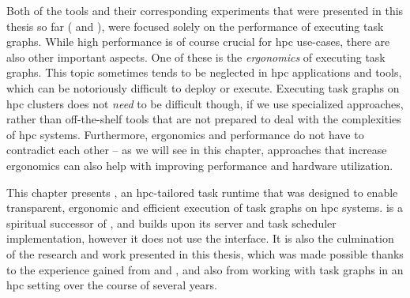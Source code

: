 Both of the tools and their corresponding experiments that were presented in this thesis so far
(\estee{} and \rsds{}), were focused solely on the performance of
executing task graphs. While high performance is of course crucial for \gls{hpc}
use-cases, there are also other important aspects. One of these is the \emph{ergonomics} of
executing task graphs. This topic sometimes tends to be neglected in \gls{hpc}
applications and tools, which can be notoriously difficult to deploy or execute. Executing task
graphs on \gls{hpc} clusters does not \emph{need} to be difficult though, if
we use specialized approaches, rather than off-the-shelf tools that are not prepared to deal with
the complexities of \gls{hpc} systems. Furthermore, ergonomics and performance do not
have to contradict each other -- as we will see in this chapter, approaches that increase
ergonomics can also help with improving performance and hardware utilization.



This chapter presents \hyperqueue{}, an \gls{hpc}-tailored task runtime that
was designed to enable transparent, ergonomic and efficient execution of task graphs on
\gls{hpc} systems. \hyperqueue{} is a spiritual successor of
\rsds{}, and builds upon its server and task scheduler implementation, however it
does not use the \dask{} interface. It is also the culmination of the research and
work presented in this thesis, which was made possible thanks to the experience gained from
\estee{} and \rsds{}, and also from working with task graphs in an
\gls{hpc} setting over the course of several years.


